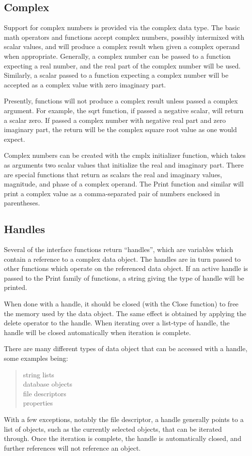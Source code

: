 \subsection{Complex}

Support for complex numbers is provided via the complex data type. 
The basic math operators and functions accept complex numbers,
possibly intermixed with scalar values, and will produce a complex
result when given a complex operand when appropriate.  Generally, a
complex number can be passed to a function expecting a real number,
and the real part of the complex number will be used.  Similarly, a
scalar passed to a function expecting a complex number will be
accepted as a complex value with zero imaginary part.

Presently, functions will not produce a complex result unless passed a
complex argument.  For example, the {\vt sqrt} function, if passed a
negative scalar, will return a scalar zero.  If passed a complex
number with negative real part and zero imaginary part, the return
will be the complex square root value as one would expect.

Complex numbers can be created with the {\vt cmplx} initializer
function, which takes as arguments two scalar values that initialize
the real and imaginary part.  There are special functions that return
as scalars the real and imaginary values, magnitude, and phase of a
complex operand.  The {\vt Print} function and similar will print a
complex value as a comma-separated pair of numbers enclosed in
parentheses.

\subsection{Handles}

Several of the interface functions return ``handles'', which are
variables which contain a reference to a complex data object.  The
handles are in turn passed to other functions which operate on the
referenced data object.  If an active handle is passed to the {\vt
Print} family of functions, a string giving the type of handle will be
printed.

When done with a handle, it should be closed (with the {\vt Close}
function) to free the memory used by the data object.  The same effect
is obtained by applying the {\vt delete} operator to the handle.  When
iterating over a list-type of handle, the handle will be closed
automatically when iteration is complete.

There are many different types of data object that can be accessed
with a handle, some examples being:
\begin{quote}
    string lists\\
    database objects\\
    file descriptors\\
    properties
\end{quote}
With a few exceptions, notably the file descriptor, a handle generally
points to a list of objects, such as the currently selected objects,
that can be iterated through.  Once the iteration is complete, the
handle is automatically closed, and further references will not reference an
object.

